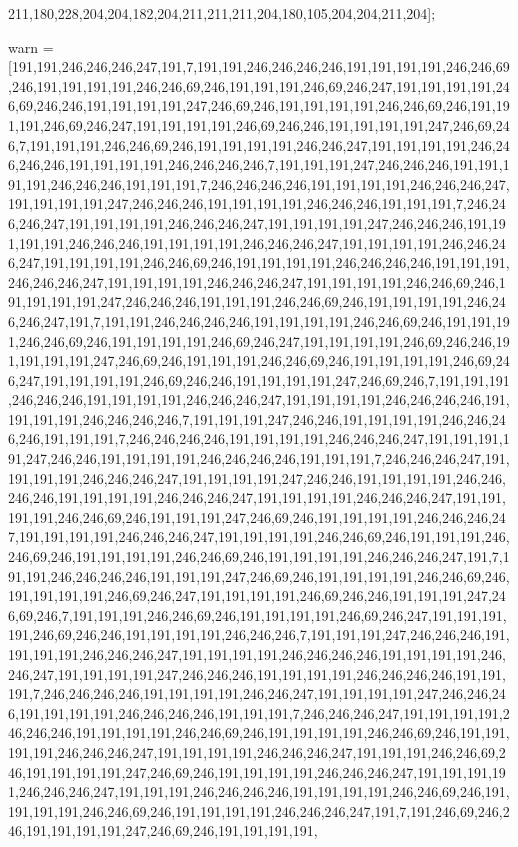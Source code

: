 211,180,228,204,204,182,204,211,211,211,204,180,105,204,204,211,204];

warn = [191,191,246,246,246,247,191,7,191,191,246,246,246,246,191,191,191,191,246,246,69,246,191,191,191,191,246,246,69,246,191,191,191,246,69,246,247,191,191,191,191,246,69,246,246,191,191,191,191,247,246,69,246,191,191,191,191,246,246,69,246,191,191,191,246,69,246,247,191,191,191,191,246,69,246,246,191,191,191,191,247,246,69,246,7,191,191,191,246,246,69,246,191,191,191,191,246,246,247,191,191,191,191,246,246,246,246,191,191,191,191,246,246,246,246,7,191,191,191,247,246,246,246,191,191,191,191,246,246,246,191,191,191,7,246,246,246,246,191,191,191,191,246,246,246,247,191,191,191,191,247,246,246,246,191,191,191,191,246,246,246,191,191,191,7,246,246,246,247,191,191,191,191,246,246,246,247,191,191,191,191,247,246,246,246,191,191,191,191,246,246,246,191,191,191,191,246,246,246,247,191,191,191,191,246,246,246,247,191,191,191,191,246,246,69,246,191,191,191,191,246,246,246,246,191,191,191,246,246,246,247,191,191,191,191,246,246,246,247,191,191,191,191,246,246,69,246,191,191,191,191,247,246,246,246,191,191,191,246,246,69,246,191,191,191,191,246,246,246,247,191,7,191,191,246,246,246,246,191,191,191,191,246,246,69,246,191,191,191,246,246,69,246,191,191,191,191,246,69,246,247,191,191,191,191,246,69,246,246,191,191,191,191,247,246,69,246,191,191,191,246,246,69,246,191,191,191,191,246,69,246,247,191,191,191,191,246,69,246,246,191,191,191,191,247,246,69,246,7,191,191,191,246,246,246,191,191,191,191,246,246,246,247,191,191,191,191,246,246,246,246,191,191,191,191,246,246,246,246,7,191,191,191,247,246,246,191,191,191,191,246,246,246,246,191,191,191,7,246,246,246,246,191,191,191,191,246,246,246,247,191,191,191,191,247,246,246,191,191,191,191,246,246,246,246,191,191,191,7,246,246,246,247,191,191,191,191,246,246,246,247,191,191,191,191,247,246,246,191,191,191,191,246,246,246,246,191,191,191,191,246,246,246,247,191,191,191,191,246,246,246,247,191,191,191,191,246,246,69,246,191,191,191,247,246,69,246,191,191,191,191,246,246,246,247,191,191,191,191,246,246,246,247,191,191,191,191,246,246,69,246,191,191,191,246,246,69,246,191,191,191,191,246,246,69,246,191,191,191,191,246,246,246,247,191,7,191,191,246,246,246,246,191,191,191,247,246,69,246,191,191,191,191,246,246,69,246,191,191,191,191,246,69,246,247,191,191,191,191,246,69,246,246,191,191,191,247,246,69,246,7,191,191,191,246,246,69,246,191,191,191,191,246,69,246,247,191,191,191,191,246,69,246,246,191,191,191,191,246,246,246,7,191,191,191,247,246,246,246,191,191,191,191,246,246,246,247,191,191,191,191,246,246,246,246,191,191,191,191,246,246,247,191,191,191,191,247,246,246,246,191,191,191,191,246,246,246,246,191,191,191,7,246,246,246,246,191,191,191,191,246,246,247,191,191,191,191,247,246,246,246,191,191,191,191,246,246,246,246,191,191,191,7,246,246,246,247,191,191,191,191,246,246,246,191,191,191,191,246,246,69,246,191,191,191,191,246,246,69,246,191,191,191,191,246,246,246,247,191,191,191,191,246,246,246,247,191,191,191,246,246,69,246,191,191,191,191,247,246,69,246,191,191,191,191,246,246,246,247,191,191,191,191,246,246,246,247,191,191,191,246,246,246,246,191,191,191,191,246,246,69,246,191,191,191,191,246,246,69,246,191,191,191,191,246,246,246,247,191,7,191,246,69,246,246,191,191,191,191,247,246,69,246,191,191,191,191,